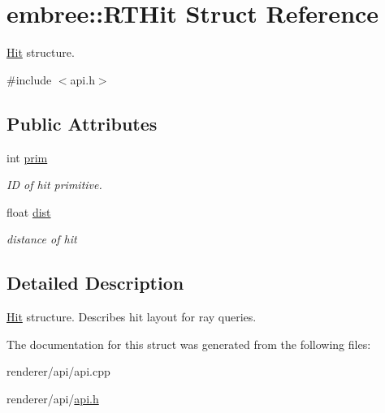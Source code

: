 \hypertarget{structembree_1_1_r_t_hit}{
\section{embree::RTHit Struct Reference}
\label{structembree_1_1_r_t_hit}
}


\hyperlink{structembree_1_1_hit}{Hit} structure.  




{\ttfamily \#include $<$api.h$>$}

\subsection*{Public Attributes}
\begin{DoxyCompactItemize}
\item 
\hypertarget{structembree_1_1_r_t_hit_a012eca07458922c104efab79e053c707}{
int \hyperlink{structembree_1_1_r_t_hit_a012eca07458922c104efab79e053c707}{prim}}
\label{structembree_1_1_r_t_hit_a012eca07458922c104efab79e053c707}

\begin{DoxyCompactList}\small\item\em ID of hit primitive. \item\end{DoxyCompactList}\item 
\hypertarget{structembree_1_1_r_t_hit_a5aa6f58ae4e9fcad0396398635497ead}{
float \hyperlink{structembree_1_1_r_t_hit_a5aa6f58ae4e9fcad0396398635497ead}{dist}}
\label{structembree_1_1_r_t_hit_a5aa6f58ae4e9fcad0396398635497ead}

\begin{DoxyCompactList}\small\item\em distance of hit \item\end{DoxyCompactList}\end{DoxyCompactItemize}


\subsection{Detailed Description}
\hyperlink{structembree_1_1_hit}{Hit} structure. Describes hit layout for ray queries. 

The documentation for this struct was generated from the following files:\begin{DoxyCompactItemize}
\item 
renderer/api/api.cpp\item 
renderer/api/\hyperlink{api_8h}{api.h}\end{DoxyCompactItemize}
